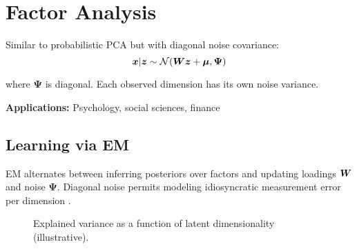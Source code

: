 
\section{Factor Analysis }
\label{sec:factor-analysis}

Similar to probabilistic PCA but with diagonal noise covariance:
\begin{equation}
\boldsymbol{x} | \boldsymbol{z} \sim \mathcal{N}(\boldsymbol{W}\boldsymbol{z} + \boldsymbol{\mu}, \boldsymbol{\Psi})
\end{equation}

where $\boldsymbol{\Psi}$ is diagonal. Each observed dimension has its own noise variance.

\textbf{Applications:} Psychology, social sciences, finance

\subsection{Learning via EM}

EM alternates between inferring posteriors over factors and updating loadings $\boldsymbol{W}$ and noise $\boldsymbol{\Psi}$. Diagonal noise permits modeling idiosyncratic measurement error per dimension \textcite{Bishop2006}.

\begin{figure}[h]
  \centering
  \caption{Explained variance as a function of latent dimensionality (illustrative).}
  \label{fig:fa-variance}
\end{figure}

